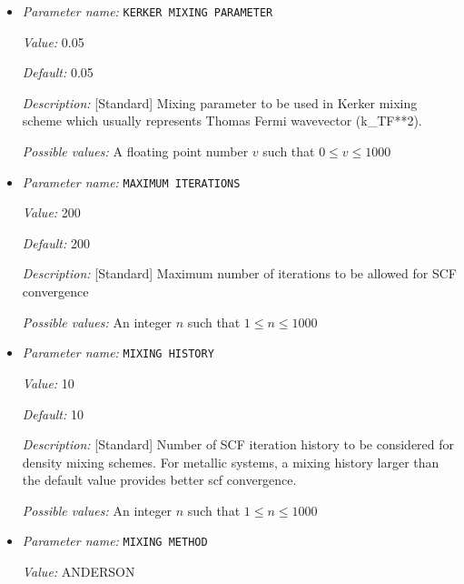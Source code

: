 \begin{itemize}
{\it Possible values:} A boolean value (true or false)
\item {\it Parameter name:} {\tt KERKER MIXING PARAMETER}
\label{parameters:SCF parameters/KERKER MIXING PARAMETER}
\label{parameters:SCF_20parameters/KERKER_20MIXING_20PARAMETER}


{\it Value:} 0.05


{\it Default:} 0.05


{\it Description:} [Standard] Mixing parameter to be used in Kerker mixing scheme which usually represents Thomas Fermi wavevector (k_{TF}**2).


{\it Possible values:} A floating point number $v$ such that $0 \leq v \leq 1000$
\item {\it Parameter name:} {\tt MAXIMUM ITERATIONS}
\label{parameters:SCF parameters/MAXIMUM ITERATIONS}
\label{parameters:SCF_20parameters/MAXIMUM_20ITERATIONS}


{\it Value:} 200


{\it Default:} 200


{\it Description:} [Standard] Maximum number of iterations to be allowed for SCF convergence


{\it Possible values:} An integer $n$ such that $1\leq n \leq 1000$
\item {\it Parameter name:} {\tt MIXING HISTORY}
\label{parameters:SCF parameters/MIXING HISTORY}
\label{parameters:SCF_20parameters/MIXING_20HISTORY}


{\it Value:} 10


{\it Default:} 10


{\it Description:} [Standard] Number of SCF iteration history to be considered for density mixing schemes. For metallic systems, a mixing history larger than the default value provides better scf convergence.


{\it Possible values:} An integer $n$ such that $1\leq n \leq 1000$
\item {\it Parameter name:} {\tt MIXING METHOD}
\label{parameters:SCF parameters/MIXING METHOD}
\label{parameters:SCF_20parameters/MIXING_20METHOD}


{\it Value:} ANDERSON



\end{itemize}
